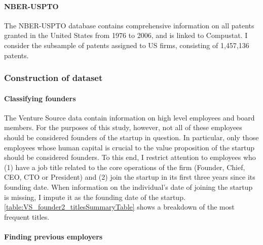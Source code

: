 \documentclass[11pt,english]{article}
\begin{document}
\paragraph{NBER-USPTO}

The NBER-USPTO database contains comprehensive information on all patents granted in the United States from 1976 to 2006, and is linked to Compustat. I consider the subsample of patents assigned to US firms, consisting of 1,457,136 patents. 

\subsubsection{Construction of dataset}

\paragraph{Classifying founders}

The Venture Source data contain information on high level employees and board members. For the purposes of this study, however, not all of these employees should be considered founders of the startup in question. In particular, only those employees whose human capital is crucial to the value proposition of the startup should be considered founders. To this end, I restrict attention to employees who (1) have a job title related to the core operations of the firm (Founder, Chief, CEO, CTO or President) and (2) join the startup in its first three years since its founding date. When information on the individual's date of joining the startup is missing, I impute it as the founding date of the startup. \autoref{table:VS_founder2_titlesSummaryTable} shows a breakdown of the most frequent titles. 



\paragraph{Finding previous employers}
\end{document}
